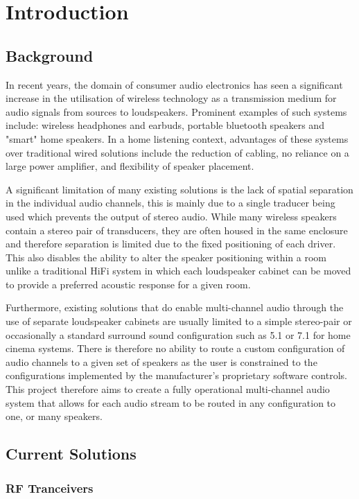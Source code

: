 \documentclass[main.tex]{subfiles}
\begin{document}
\chapter{Introduction}
\section{Background}
In recent years, the domain of consumer audio electronics has seen a significant increase in the utilisation of wireless technology as a transmission medium for audio signals from sources to loudspeakers.
Prominent examples of such systems include: wireless headphones and earbuds, portable bluetooth speakers and "smart" home speakers. 
In a home listening context, advantages of these systems over traditional wired solutions include the reduction of cabling, no reliance on a large power amplifier, and flexibility of speaker placement.

\medskip
A significant limitation of many existing solutions is the lack of spatial separation in the individual audio channels, this is mainly due to a single traducer being used which prevents the output of stereo audio.
While many wireless speakers contain a stereo pair of transducers, they are often housed in the same enclosure and therefore separation is limited due to the fixed positioning of each driver.
This also disables the ability to alter the speaker positioning within a room unlike a traditional HiFi system in which each loudspeaker cabinet can be moved to provide a preferred acoustic response for a given room. 

\medskip
Furthermore, existing solutions that do enable multi-channel audio through the use of separate loudspeaker cabinets are usually limited to a simple stereo-pair or occasionally a standard surround sound configuration such as 5.1 or 7.1 for home cinema systems.
There is therefore no ability to route a custom configuration of audio channels to a given set of speakers as the user is constrained to the configurations implemented by the manufacturer's proprietary software controls. 
This project therefore aims to create a fully operational multi-channel audio system that allows for each audio stream to be routed in any configuration to one, or many speakers.


\section{Current Solutions}
\subsection{RF Tranceivers}
\end{document}
